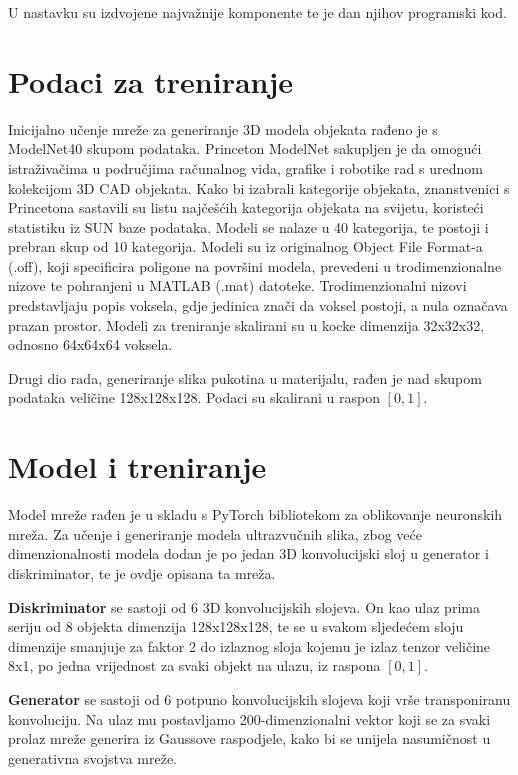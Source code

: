 \documentclass[times, utf8, diplomski]{fer}
\begin{document}
U nastavku su izdvojene najvažnije komponente te je dan njihov programski kod.

\section{Podaci za treniranje}
Inicijalno učenje mreže za generiranje 3D modela objekata rađeno je s ModelNet40 \cite{modelNet} skupom podataka. Princeton ModelNet sakupljen je da omogući istraživačima u područjima računalnog vida, grafike i robotike rad s urednom kolekcijom 3D CAD objekata. Kako bi izabrali kategorije objekata, znanstvenici s Princetona sastavili su listu najčešćih kategorija objekata na svijetu, koristeći statistiku iz SUN baze podataka. Modeli se nalaze u 40 kategorija, te postoji i prebran skup od 10 kategorija. \cite{modelNet} Modeli su iz originalnog Object File Format-a (.off),  koji specificira poligone na površini modela,  prevedeni u trodimenzionalne nizove te pohranjeni u MATLAB (.mat) datoteke. Trodimenzionalni nizovi predstavljaju popis voksela, gdje jedinica znači da voksel postoji, a nula označava prazan prostor. Modeli za treniranje skalirani su u kocke dimenzija 32x32x32, odnosno 64x64x64 voksela.

Drugi dio rada, generiranje slika pukotina u materijalu, rađen je nad skupom podataka veličine 128x128x128. Podaci su skalirani u raspon \([0, 1]\).

\section{Model i treniranje}
Model mreže rađen je u skladu s PyTorch bibliotekom za oblikovanje neuronskih mreža. Za učenje i generiranje modela ultrazvučnih slika, zbog veće dimenzionalnosti modela dodan je po jedan 3D konvolucijski sloj u generator i diskriminator, te je ovdje opisana ta mreža.

\textbf{Diskriminator} se sastoji od 6 3D konvolucijskih slojeva. On kao ulaz prima seriju od 8 objekta dimenzija 128x128x128, te se u svakom sljedećem sloju dimenzije smanjuje za faktor 2 do izlaznog sloja kojemu je izlaz tenzor veličine 8x1, po jedna vrijednost za svaki objekt na ulazu, iz raspona \([0, 1]\).  

\textbf{Generator} se sastoji od 6 potpuno konvolucijskih slojeva koji vrše transponiranu konvoluciju. Na ulaz mu postavljamo 200-dimenzionalni vektor koji se za svaki prolaz mreže generira iz Gaussove raspodjele, kako bi se unijela nasumičnost u generativna svojstva mreže.
\end{document}
